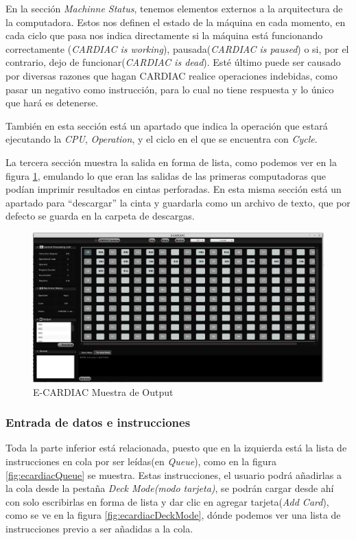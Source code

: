 \documentclass[letterpaper,12pt,oneside]{book}
\begin{document}
	En la sección \textit{Machinne Status}, tenemos elementos externos a la arquitectura de la computadora. Estos nos definen el
	estado de la máquina en cada momento, en cada ciclo que pasa nos indica directamente si la máquina está funcionando correctamente (\textit{CARDIAC is working}),
	pausada(\textit{CARDIAC is paused}) o si, por el contrario, dejo de funcionar(\textit{CARDIAC is dead}). Esté último puede ser causado por diversas razones
	que hagan CARDIAC realice operaciones indebidas, como pasar un negativo como instrucción, para lo cual no tiene respuesta
	y lo único que hará es detenerse. 
 
    También en esta sección está un apartado que indica la operación que estará ejecutando la \textit{CPU}, \textit{Operation}, y el ciclo en el que se encuentra con \textit{Cycle}.

  
 
	La tercera sección muestra la salida en forma de lista, como podemos ver en la figura \ref{fig:ecardiacOutput}, emulando lo que eran las salidas de las primeras 
	computadoras que podían imprimir resultados
	en cintas perforadas. En esta misma sección está un apartado para ``descargar'' la cinta y guardarla
	como un archivo de texto, que por defecto se guarda en la carpeta de descargas.

	\begin{figure}[h]
 			\centering
			\includegraphics[scale=0.27]{media/ECARDIAC/OutputFullfilled.png}
			\caption{E-CARDIAC Muestra de Output}
			\label{fig:ecardiacOutput}
	\end{figure}

    \subsubsection{Entrada de datos e instrucciones}
 
	Toda la parte inferior está relacionada, puesto que en la izquierda está la lista de instrucciones en cola por ser leídas(en \textit{Queue}),
	como en la figura \ref{fig:ecardiacQueue} se muestra. Estas instrucciones,
	el usuario podrá añadirlas a la cola desde la pestaña \textit{Deck Mode(modo tarjeta)}, se podrán cargar desde ahí con solo escribirlas
	en forma de lista y dar clic en agregar tarjeta(\textit{Add Card}), como se ve en la figura \ref{fig:ecardiacDeckMode}, dónde podemos ver una
	lista de instrucciones previo a ser añadidas a la cola.
 
\end{document}
